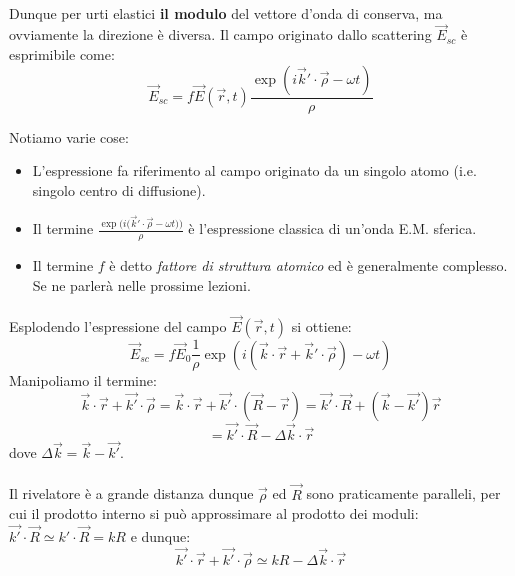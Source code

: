 \documentclass{book}
\begin{document}
                \paragraph{}
                    Dunque per urti elastici \textbf{il modulo} del vettore d'onda di conserva, ma ovviamente la direzione è diversa. Il campo originato dallo scattering $\vec{E}_{sc}$ è esprimibile come:
                    $$\vec{E}_{sc} = f\vec{E}(\vec{r},t)\frac{\exp({i \vec{k}' \cdot \vec{\rho}} - \omega t)}{\rho}$$

                    Notiamo varie cose: 
                    \begin{itemize}
                        \item  L'espressione fa riferimento al campo originato da un singolo atomo (i.e. singolo centro di diffusione).
                        \item Il termine $\displaystyle \frac{\exp{(i (\vec{k}' \cdot \vec{\rho}}-\omega t))}{\rho}$ è l'espressione classica di un'onda E.M. sferica.
                        \item Il termine $f$ è detto \textit{fattore di struttura atomico} ed è generalmente complesso. Se ne parlerà nelle prossime lezioni.
                    \end{itemize} 

                \paragraph{}Esplodendo l'espressione del campo $\vec{E}(\vec{r},t)$ si ottiene:
                $$\vec{E}_{sc} = f \vec{E}_{0} \frac{1}{\rho} \exp{(i(\vec{k} \cdot \vec{r} + \vec{k}' \cdot \vec{\rho}) - \omega t)}$$
                Manipoliamo il termine:
                $$\vec{k} \cdot \vec{r} + \vec{k'} \cdot \vec{\rho} = \vec{k} \cdot \vec{r} + \vec{k'} \cdot (\vec{R}-\vec{r}) = \vec{k'} \cdot \vec{R} + (\vec{k}-\vec{k'})\vec{r}$$
                $$ = \vec{k'} \cdot \vec{R}-\Delta \vec{k} \cdot \vec{r}$$
                dove $\Delta \vec{k} = \vec{k}-\vec{k'}$.

                \paragraph{}
                    Il rivelatore è a grande distanza dunque $\vec{\rho}$ ed $\vec{R}$ sono praticamente paralleli, per cui il prodotto interno si può approssimare al prodotto dei moduli:
                    $\vec{k'} \cdot \vec{R} \simeq k' \cdot \vec{R} = k R$
                    e dunque:
                    $$\vec{k'} \cdot \vec{r}+ \vec{k'} \cdot \vec{\rho} \simeq kR - \Delta \vec{k} \cdot \vec{r}$$
\end{document}
